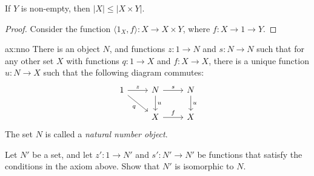 \begin{prop} If $Y$ is non-empty, then $|X|\leq |X\times
  Y|$. \end{prop}

\begin{proof} Consider the function $\langle 1_X,f\rangle :X\to
  X\times Y$, where $f:X\to 1\to Y$. \end{proof}






\begin{axi}{ax:nno} There is an object $N$, and
  functions $z:1\to N$ and $s:N\to N$ such that for any other set $X$
  with functions $q:1\to X$ and $f:X\to X$, there is a unique function
  $u:N\to X$ such that the following diagram commutes:
\[ \begin{tikzcd} 
1 \arrow[r,"z"] \arrow[rd,"q"'] & N \arrow[r,"s"] \arrow[d,"u"] & N \arrow[d,"u"] \\
 & X \arrow[r,"f"] & X 
\end{tikzcd} \] The set $N$ is called a \emph{natural number
  object}. \label{ax:nno} \end{axi}

\begin{exercise} Let $N'$ be a set, and let $z':1\to N'$ and $s':N'\to
  N'$ be functions that satisfy the conditions in the axiom above.
  Show that $N'$ is isomorphic to $N$. \end{exercise}







